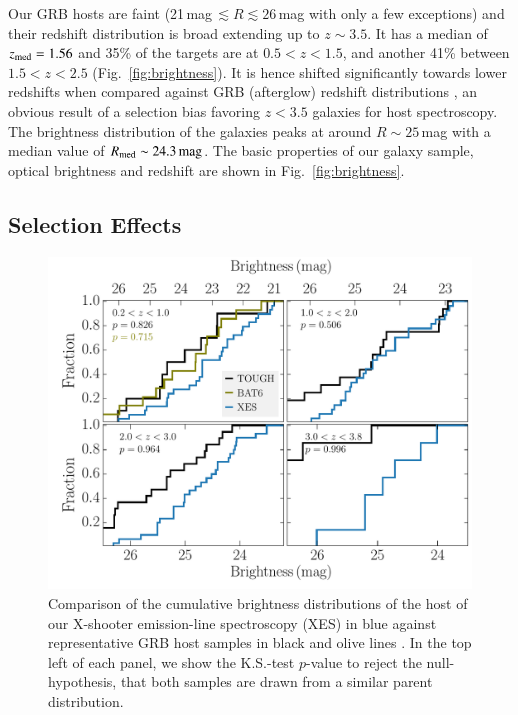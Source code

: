 \documentclass[traditabstract, longauth]{aa}
\begin{document}
Our GRB hosts are faint (21\,mag\,$\lesssim R\lesssim 26$\,mag with only a few exceptions) and their redshift distribution is broad extending up to $z\sim3.5$. It has a median of $z_{\rm{med}}=1.56$ and 35\% of the targets are at $0.5<z<1.5$, and another 41\% between $1.5<z<2.5$ (Fig.~\ref{fig:brightness}). {It is hence shifted significantly towards lower redshifts when compared against GRB (afterglow) redshift distributions \citep[][]{2011A&A...526A..30G, 2012ApJ...752...62J, 2012ApJ...749...68S, 2015arXiv150402482P}, an obvious result of a selection bias favoring $z<3.5$ galaxies for host spectroscopy. The brightness distribution of the galaxies peaks at around $R\sim25\,$mag with a median value of $R_{\rm med}\sim24.3\,\rm{mag}$. The basic properties of our galaxy sample, optical brightness and redshift are shown in Fig.~\ref{fig:brightness}.}

\subsection{Selection Effects}
\label{sec:seleffects}

\begin{figure}
\includegraphics[angle=0, width=0.99\columnwidth]{Figs/Bdist.pdf}
\caption{Comparison of the cumulative brightness distributions of the host of our X-shooter emission-line spectroscopy (XES) in blue against representative GRB host samples in black and olive lines \citep{2012ApJ...756..187H, 2014arXiv1409.7064V}. In the top left of each panel, we show the K.S.-test $p$-value to reject the null-hypothesis, that both samples are drawn from a similar parent distribution.}
\label{fig:selection}
\end{figure}
\end{document}
